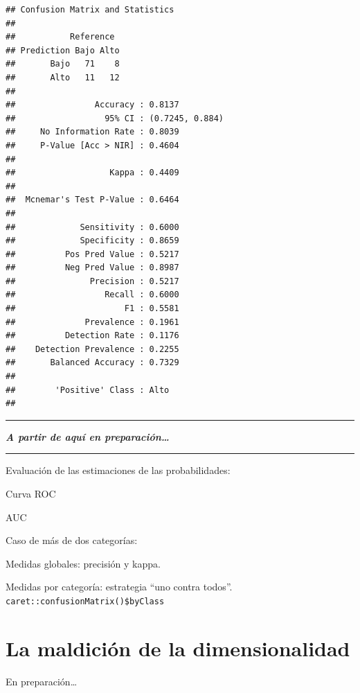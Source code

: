\documentclass[]{book}
\theoremstyle{break}
\theoremstyle{definition}
\theoremstyle{definition}
\theoremstyle{definition}
\theoremstyle{remark}
\begin{document}
\begin{verbatim}
## Confusion Matrix and Statistics
## 
##           Reference
## Prediction Bajo Alto
##       Bajo   71    8
##       Alto   11   12
##                                          
##                Accuracy : 0.8137         
##                  95% CI : (0.7245, 0.884)
##     No Information Rate : 0.8039         
##     P-Value [Acc > NIR] : 0.4604         
##                                          
##                   Kappa : 0.4409         
##                                          
##  Mcnemar's Test P-Value : 0.6464         
##                                          
##             Sensitivity : 0.6000         
##             Specificity : 0.8659         
##          Pos Pred Value : 0.5217         
##          Neg Pred Value : 0.8987         
##               Precision : 0.5217         
##                  Recall : 0.6000         
##                      F1 : 0.5581         
##              Prevalence : 0.1961         
##          Detection Rate : 0.1176         
##    Detection Prevalence : 0.2255         
##       Balanced Accuracy : 0.7329         
##                                          
##        'Positive' Class : Alto           
## 
\end{verbatim}

\begin{center}\rule{0.5\linewidth}{0.5pt}\end{center}

\textbf{\emph{A partir de aquí en preparación\ldots{}}}

\begin{center}\rule{0.5\linewidth}{0.5pt}\end{center}

Evaluación de las estimaciones de las probabilidades:

Curva ROC

AUC

Caso de más de dos categorías:

Medidas globales: precisión y kappa.

Medidas por categoría: estrategia ``uno contra todos''.
\texttt{caret::confusionMatrix()\$byClass}

\section{La maldición de la
dimensionalidad}\label{la-maldiciuxf3n-de-la-dimensionalidad}

En preparación\ldots{}
\end{document}
